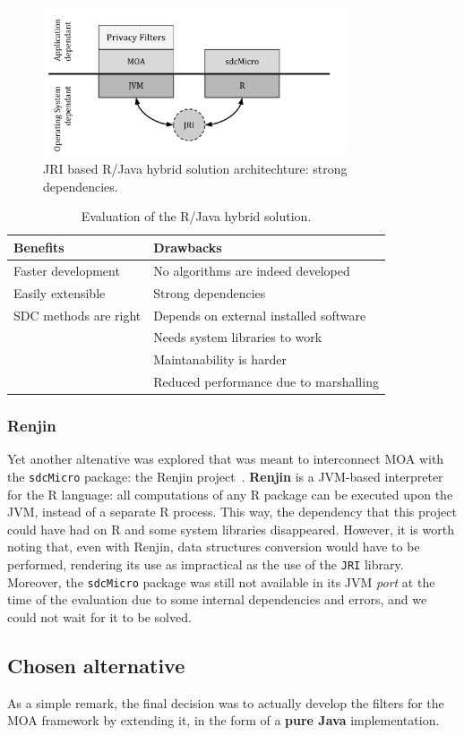 \begin{figure}[h]
	\centering
	\includegraphics[width=0.8\textwidth]{figures/moa-ppsm-JRI-arch.pdf}
	\caption[R/Java hybrid solution: strong dependencies.]{JRI based R/Java hybrid solution architechture: strong dependencies.}
	\label{fig:ppsm-JRI-arch}
\end{figure}

\begin{table}
	\centering
	\begin{tabular}{ll}
		\hline
		\textbf{Benefits}     & \textbf{Drawbacks}                     \\ \hline
		Faster development    & No algorithms are indeed developed     \\
		Easily extensible     & Strong dependencies                    \\
		SDC methods are right & Depends on external installed software \\
		                      & Needs system libraries to work         \\
		                      & Maintanability is harder               \\
		                      & Reduced performance due to marshalling \\ \hline
	\end{tabular}
	\caption{Evaluation of the R/Java hybrid solution.}
	\label{table:JRI-pros-cons}
\end{table}

\subsubsection{Renjin}

Yet another altenative was explored that was meant to interconnect MOA with the \texttt{sdcMicro} package: the Renjin project~\citep{web:Renjin}. \textbf{Renjin} is a JVM-based interpreter for the R language: all computations of any R package can be executed upon the JVM, instead of a separate R process. This way, the dependency that this project could have had on R and some system libraries disappeared. However, it is worth noting that, even with Renjin, data structures conversion would have to be performed, rendering its use as impractical as the use of the \texttt{JRI} library. Moreover, the \texttt{sdcMicro} package was still not available in its JVM \textit{port} at the time of the evaluation due to some internal dependencies and errors, and we could not wait for it to be solved.

\subsection{Chosen alternative}

As a simple remark, the final decision was to actually develop the filters for the MOA framework by extending it, in the form of a \textbf{pure Java} implementation.